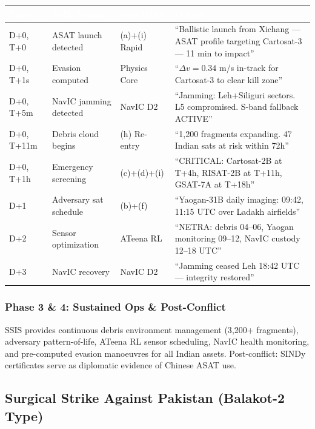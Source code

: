 \documentclass[11pt,a4paper]{article}
\newcommand{\TH}[1]{\textcolor{white}{\textbf{#1}}}
\begin{document}
\begin{table}[H]\centering\small
\begin{tabularx}{\textwidth}{|p{2cm}|p{3.5cm}|p{2.5cm}|X|}
\hline
\rowcolor{dblue}\TH{Time} & \TH{SSIS Action} & \TH{Capability} & \TH{Output} \\
\hline
D+0, T+0 & ASAT launch detected & (a)+(i) Rapid & ``Ballistic launch from Xichang --- ASAT profile targeting Cartosat-3 --- 11 min to impact'' \\
\hline
D+0, T+1s & Evasion computed & Physics Core & ``$\Delta v=0.34$ m/s in-track for Cartosat-3 to clear kill zone'' \\
\hline
D+0, T+5m & NavIC jamming detected & NavIC D2 & ``Jamming: Leh+Siliguri sectors. L5 compromised. S-band fallback ACTIVE'' \\
\hline
D+0, T+11m & Debris cloud begins & (h) Re-entry & ``1{,}200 fragments expanding. 47 Indian sats at risk within 72h'' \\
\hline
D+0, T+1h & Emergency screening & (c)+(d)+(i) & ``CRITICAL: Cartosat-2B at T+4h, RISAT-2B at T+11h, GSAT-7A at T+18h'' \\
\hline
D+1 & Adversary sat schedule & (b)+(f) & ``Yaogan-31B daily imaging: 09:42, 11:15 UTC over Ladakh airfields'' \\
\hline
D+2 & Sensor optimization & ATeena RL & ``NETRA: debris 04--06, Yaogan monitoring 09--12, NavIC custody 12--18 UTC'' \\
\hline
D+3 & NavIC recovery & NavIC D2 & ``Jamming ceased Leh 18:42 UTC --- integrity restored'' \\
\hline
\end{tabularx}
\end{table}

\subsubsection{Phase 3 \& 4: Sustained Ops \& Post-Conflict}
SSIS provides continuous debris environment management (3{,}200+ fragments), adversary pattern-of-life, ATeena RL sensor scheduling, NavIC health monitoring, and pre-computed evasion manoeuvres for all Indian assets. Post-conflict: SINDy certificates serve as diplomatic evidence of Chinese ASAT use.

\subsection{Surgical Strike Against Pakistan (Balakot-2 Type)}
\end{document}
